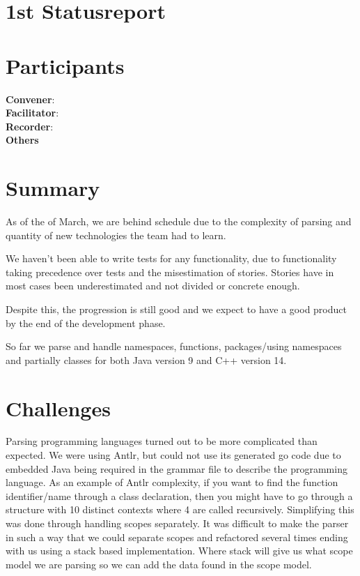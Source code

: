 \usepackage[super]{nth}



\section*{1st Statusreport}

\section*{Participants}

\textbf{Convener}: \groupleader{}     \\
\textbf{Facilitator}: \facilitator{}  \\ 
\textbf{Recorder}: \scrummaster{}   \\ 
\textbf{Others}                    \\

\section*{Summary}
As of the  of March, we are behind schedule due to the complexity of parsing and quantity of new technologies the team had to learn. 

We haven't been able to write tests for any functionality, due to functionality taking precedence over tests and the misestimation of stories. Stories have in most cases been underestimated and not divided or concrete enough. 

Despite this, the progression is still good and we expect to have a good product by the end of the development phase. 

So far we parse and handle namespaces, functions, packages/using namespaces and partially classes for both Java version 9 and C++ version 14.

\section*{Challenges}
Parsing programming languages turned out to be more complicated than expected. We were using Antlr, but could not use its generated go code due to embedded Java being required in the grammar file to describe the programming language. As an example of Antlr complexity, if you want to find the function identifier/name through a class declaration, then you might have to go through a structure with 10 distinct contexts where 4 are called recursively. Simplifying this was done through handling scopes separately. It was difficult to make the parser in such a way that we could separate scopes and refactored several times ending with us using a stack based implementation. Where stack will give us what scope model we are parsing so we can add the data found in the scope model.

